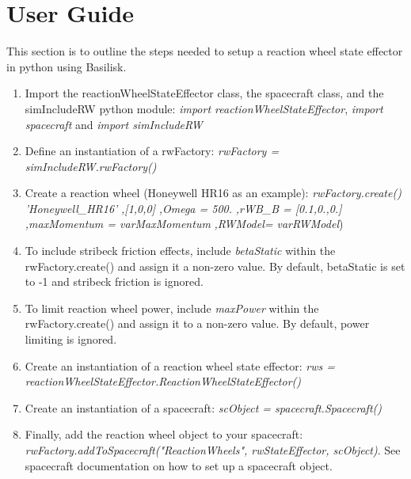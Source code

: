 \section{User Guide}

This section is to outline the steps needed to setup a reaction wheel state effector in python using Basilisk.

\begin{enumerate}
	\item Import the reactionWheelStateEffector class, the spacecraft class, and the simIncludeRW python module: \newline \textit{import reactionWheelStateEffector}, \textit{import spacecraft} and \textit{import simIncludeRW}
	\item Define an instantiation of a rwFactory: \newline
	\textit{rwFactory = simIncludeRW.rwFactory()}
	\item Create a reaction wheel (Honeywell HR16 as an example): \newline 
	\textit{rwFactory.create()} \newline
		\textit{'Honeywell\_HR16'} \newline
		\textit{,[1,0,0]} \newline
		\textit{,Omega = 500.} \newline
		\textit{,rWB\_B = [0.1,0.,0.]} \newline
		\textit{,maxMomentum = varMaxMomentum} \newline
		\textit{,RWModel= varRWModel})
	\item To include stribeck friction effects, include \textit{ betaStatic } within the rwFactory.create() and assign it a non-zero value. By default, betaStatic is set to -1 and stribeck friction is ignored. 
	\item To limit reaction wheel power, include \textit{maxPower} within the rwFactory.create() and assign it to a non-zero value. By default, power limiting is ignored.
	\item Create an instantiation of a reaction wheel state effector: \newline \textit{rws = reactionWheelStateEffector.ReactionWheelStateEffector()}
	\item Create an instantiation of a spacecraft: \newline
	\textit{scObject = spacecraft.Spacecraft()}
	\item Finally, add the reaction wheel object to your spacecraft:\newline
	\textit{rwFactory.addToSpacecraft("ReactionWheels", rwStateEffector, scObject)}. See spacecraft documentation on how to set up a spacecraft object.
\end{enumerate}
